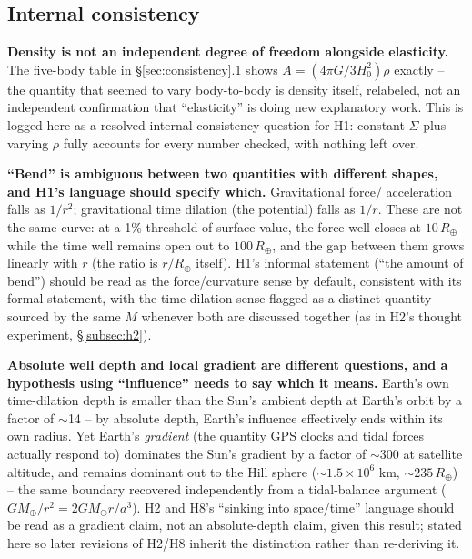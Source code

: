 \documentclass[12pt, a4paper]{article}
\begin{document}
\subsection{Internal consistency}
\textbf{Density is not an independent degree of freedom alongside
elasticity.} The five-body table in \S\ref{sec:consistency}.1 shows
$A=(4\pi G/3H_0^2)\rho$ exactly -- the quantity that seemed to vary
body-to-body is density itself, relabeled, not an independent
confirmation that ``elasticity'' is doing new explanatory work. This
is logged here as a resolved internal-consistency question for H1:
constant $\Sigma$ plus varying $\rho$ fully accounts for every number
checked, with nothing left over.

\textbf{``Bend'' is ambiguous between two quantities with different
shapes, and H1's language should specify which.} Gravitational force/
acceleration falls as $1/r^2$; gravitational time dilation (the
potential) falls as $1/r$. These are not the same curve: at a 1\%
threshold of surface value, the force well closes at $10\,R_\oplus$
while the time well remains open out to $100\,R_\oplus$, and the gap
between them grows linearly with $r$ (the ratio is $r/R_\oplus$
itself). H1's informal statement (``the amount of bend'') should be
read as the force/curvature sense by default, consistent with its
formal statement, with the time-dilation sense flagged as a distinct
quantity sourced by the same $M$ whenever both are discussed together
(as in H2's thought experiment, \S\ref{subsec:h2}).

\textbf{Absolute well depth and local gradient are different
questions, and a hypothesis using ``influence'' needs to say which it
means.} Earth's own time-dilation depth is smaller than the Sun's
ambient depth at Earth's orbit by a factor of $\sim$14 -- by absolute
depth, Earth's influence effectively ends within its own radius. Yet
Earth's \emph{gradient} (the quantity GPS clocks and tidal forces
actually respond to) dominates the Sun's gradient by a factor of
$\sim$300 at satellite altitude, and remains dominant out to the Hill
sphere ($\sim1.5\times10^6$ km, $\sim235\,R_\oplus$) -- the same
boundary recovered independently from a tidal-balance argument
($GM_\oplus/r^2 = 2GM_\odot r/a^3$). H2 and H8's ``sinking into
space/time'' language should be read as a gradient claim, not an
absolute-depth claim, given this result; stated here so later
revisions of H2/H8 inherit the distinction rather than re-deriving it.
\end{document}
